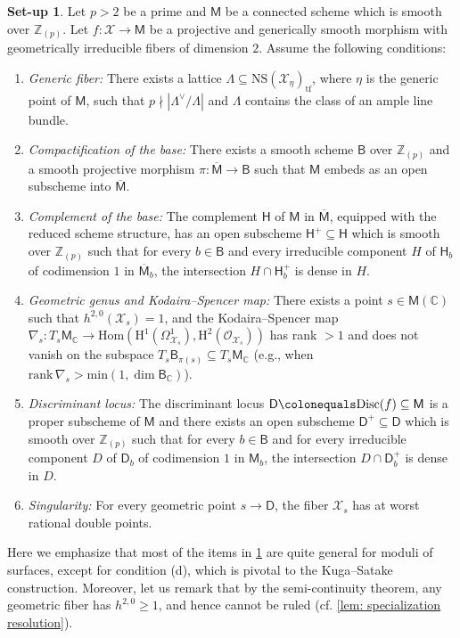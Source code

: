 \documentclass[11pt, letterpaper]{amsart}
\theoremstyle{plain}
\theoremstyle{definition}
\newtheorem{set-up}[theorem]{Set-up}
\newcommand{\IC}{\mathbb{C}}
\newcommand{\IZ}{\mathbb{Z}}
\newcommand{\Hom}{\mathrm{Hom}}
\newcommand{\<}{\langle}
\renewcommand{\>}{\rangle}
\newcommand{\Ohm}{\Omega}
\newcommand{\sO}{\mathcal{O}}
\newcommand{\NS}{\mathrm{NS}}
\newcommand{\sfD}{\mathsf{D}}
\newcommand{\sfM}{\mathsf{M}}
\newcommand{\sX}{\mathcal{X}}
\renewcommand{\H}{\mathrm{H}}
\newcommand{\sfH}{\mathsf{H}}
\newcommand{\sfB}{\mathsf{B}}
\begin{document}
\begin{set-up} \label{set-up: surfaces}
    Let $p > 2$ be a prime and $\sfM$ be a connected scheme which is smooth over $\IZ_{(p)}$. 
    Let $f : \sX \to \sfM$ be a projective and generically smooth morphism with geometrically irreducible fibers of dimension $2$. Assume the following conditions:   
    \begin{enumerate}[label=\upshape{(\alph*)}]
        \item \emph{Generic fiber:}  There exists a lattice $\Lambda \subseteq \NS(\sX_\eta)_{\mathrm{tf}}$, where $\eta$ is the generic point of $\sfM$, such that $p \nmid |\Lambda^\vee / \Lambda|$ and $\Lambda$ contains the class of an ample line bundle. 
        \item \emph{Compactification of the base:} There exists a smooth scheme $\sfB$ over $\IZ_{(p)}$ and a smooth projective morphism $\pi : \overline{\sfM} \to \sfB$ such that $\sfM$ embeds as an open subscheme into $\overline{\sfM}$. 
        \item \emph{Complement of the base:} The complement $\sfH$ of $\sfM$ in $\overline{\sfM}$, equipped with the reduced scheme structure, has an open subscheme $\sfH^+ \subseteq \sfH$ which is smooth over $\IZ_{(p)}$ such that for every $b \in \sfB$ and every irreducible component $H$ of $\sfH_b$ of codimension $1$ in $\overline{\sfM}_b$, the intersection $H \cap \sfH^+_{b}$ is dense in $H$. 
        \item \emph{Geometric genus and Kodaira--Spencer map:} 
        There exists a point $s \in \sfM(\IC)$ such that $h^{2,0}(\sX_s) = 1$, and the Kodaira--Spencer map $\nabla_s : T_s \sfM_\IC \to \Hom(\H^1(\Ohm^1_{\sX_s}), \H^2(\sO_{\sX_s}))$ has rank $> 1$ and does not vanish on the subspace $T_{s} \sfB_{\pi(s)} \subseteq T_s \sfM_\IC$ (e.g., when $\mathrm{rank\,} \nabla_s > \mathrm{min}(1, \dim \sfB_\IC)$). 
        \item \emph{Discriminant locus:} The discriminant locus $\sfD \colonequals \mathrm{Disc}(f) \subseteq \sfM$ is a proper subscheme of $\sfM$ and there exists an open subscheme $\sfD^+ \subseteq \sfD$ which is smooth over $\IZ_{(p)}$ such that for every $b \in \sfB$ and for every irreducible component $D$ of $\sfD_b$ of codimension $1$ in $\sfM_b$, the intersection $D \cap \sfD^+_{b}$ is dense in $D$. 
        \item \emph{Singularity:} For every geometric point $s \to \sfD$, the fiber $\sX_s$ has at worst rational double points.
    \end{enumerate}
\end{set-up}
Here we emphasize that most of the items in \cref{set-up: surfaces} are quite general for moduli of surfaces, except for condition (d), which is pivotal to the Kuga--Satake construction. Moreover, let us remark that by the semi-continuity theorem, any geometric fiber has $h^{2,0} \ge 1$, and hence cannot be ruled (cf. \cref{lem: specialization resolution}). 
\end{document}
